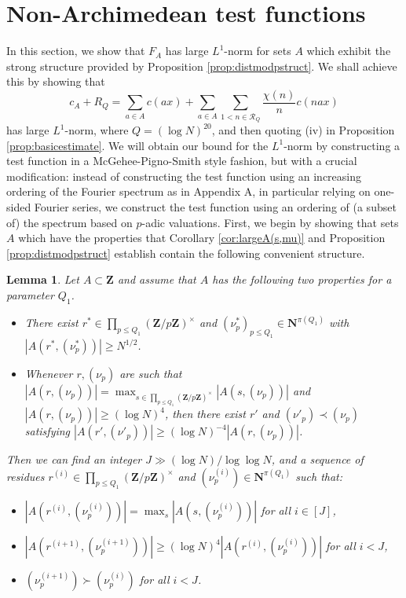 \documentclass[11pt, reqno]{amsart}
\newtheorem{lemma}[theorem]{Lemma}
\begin{document}
\section{Non-Archimedean test functions}
In this section, we show that $F_A$ has large $L^1$-norm for sets $A$ which exhibit the strong structure provided by Proposition \ref{prop:distmodpstruct}. We shall achieve this by showing that $$c_A+R_Q=\sum_{a\in A}c(ax)+\sum_{a\in A}\sum_{1<n\in\mathcal{R}_Q}\frac{\chi(n)}{n}c(nax)$$ has large $L^1$-norm, where $Q=(\log N)^{20}$, and then quoting (iv) in Proposition \ref{prop:basicestimate}. We will obtain our bound for the $L^1$-norm by constructing a test function in a McGehee-Pigno-Smith style fashion, but with a crucial modification: instead of constructing the test function using an increasing ordering of the Fourier spectrum as in Appendix A, in particular relying on one-sided Fourier series, we construct the test function using an ordering of (a subset of) the spectrum based on $p$-adic valuations. First, we begin by showing that sets $A$ which have the properties that Corollary \ref{cor:largeA(s,mu)} and Proposition \ref{prop:distmodpstruct} establish contain the following convenient structure.
\begin{lemma}\label{lem:Astrongstructure}
    Let $A\subset\mathbf{Z}$ and assume that $A$ has the following two properties for a parameter $Q_1$.
    \begin{itemize}
        \item There exist $r^{*}\in\prod_{p\leqslant Q_1}(\mathbf{Z}/p\mathbf{Z})^\times$ and $(\nu_p^{*})_{p\leqslant Q_1}\in\mathbf{N}^{\pi(Q_1)}$ with $|A(r^{*},(\nu_p^{*}))|\geqslant N^{1/2}$.
        \item Whenever $r,(\nu_p)$ are such that $|A(r,(\nu_p))|=\max_{s\in \prod_{p\leqslant Q_1}(\mathbf{Z}/p\mathbf{Z})^\times}|A(s,(\nu_p))|$ and $|A(r,(\nu_p))|\geqslant (\log N)^4$, then there exist $r'$ and $(\nu'_p)\prec (\nu_p)$ satisfying $|A(r',(\nu'_p))|\geqslant (\log N)^{-4}|A(r,(\nu_p))|$.
    \end{itemize}
    Then we can find an integer $J\gg (\log N)/ \log \log N $, and a sequence of residues $r^{(i)}\in\prod_{p\leqslant Q_1}(\mathbf{Z}/p\mathbf{Z})^\times$ and $(\nu_p^{(i)})\in\mathbf{N}^{\pi(Q_1)}$ such that:
    \begin{itemize}
        \item [(i)] $|A(r^{(i)},(\nu_p^{(i)}))|=\max_s |A(s,(\nu_p^{(i)}))|$ for all $i\in[J]$,
        \item [(ii)] $|A(r^{(i+1)},(\nu_p^{(i+1)}))|\geqslant (\log N)^{4}|A(r^{(i)},(\nu_p^{(i)}))|$ for all $i<J$,
        \item [(iii)] $(\nu_p^{(i+1)})\succ (\nu_p^{(i)})$ for all $i<J$.
    \end{itemize}
\end{lemma}
\end{document}
